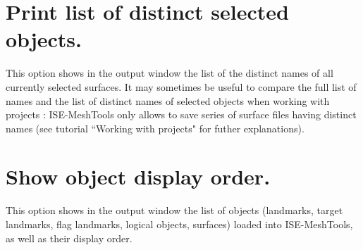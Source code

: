 \section{Print list of distinct selected objects.}
This option shows in the output window the list of the distinct names of all currently selected
surfaces. It may sometimes be useful to compare the full list of names and the list of distinct names
of selected objects when working with projects : ISE-MeshTools only allows to save series of surface
files having distinct names (see tutorial ``Working with projects" for futher explanations).
\section{Show object display order.}
This option shows in the output window the list of objects (landmarks, target landmarks, flag landmarks, logical objects, surfaces) loaded into ISE-MeshTools, as well as their display order.